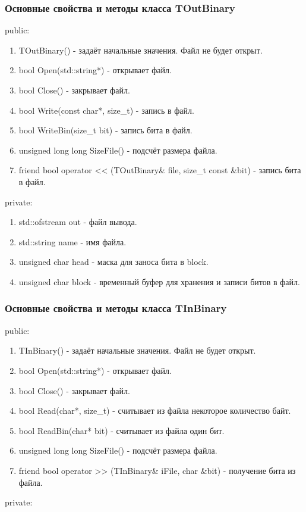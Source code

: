 \documentclass[12pt]{article}
\begin{document}
\subsubsection*{Основные свойства и методы класса TOutBinary}
\noindent
public:

\begin{enumerate}
	\item TOutBinary() - задаёт начальные значения. Файл не будет открыт.
	\item bool Open(std::string*) - открывает файл.
	\item bool Close() - закрывает файл.
	\item bool Write(const char*, size\_t) - запись в файл.
	\item bool WriteBin(size\_t bit) - запись бита в файл.
	\item unsigned long long SizeFile() - подсчёт размера файла.
	\item friend bool operator << (TOutBinary\& file, size\_t const \&bit) - запись бита в файл.
\end{enumerate}
\noindent
private:

\begin{enumerate}
	\item std::ofstream out - файл вывода.
    \item std::string name - имя файла.
    \item unsigned char head - маска для заноса бита в block.
    \item unsigned char block - временный буфер для хранения и записи битов в файл.
\end{enumerate}

\subsubsection*{Основные свойства и методы класса TInBinary}
\noindent
public:

\begin{enumerate}
	\item TInBinary() - задаёт начальные значения. Файл не будет открыт.
	\item bool Open(std::string*) - открывает файл.
	\item bool Close() - закрывает файл.
	\item bool Read(char*, size\_t) - считывает из файла некоторое количество байт.
	\item bool ReadBin(char* bit) - считывает из файла один бит.
	\item unsigned long long SizeFile() - подсчёт размера файла.
	\item friend bool operator >> (TInBinary\& iFile, char \&bit) - получение бита из файла.
\end{enumerate}
\noindent
private:
\end{document}
